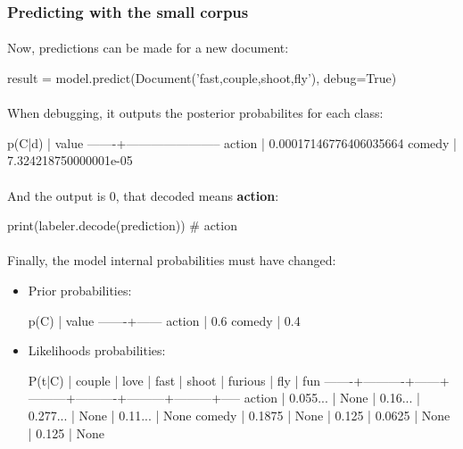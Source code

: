 \documentclass{article}
\begin{document}
\clearpage

\subsubsection*{Predicting with the small corpus}

\paragraph{} Now, predictions can be made for a new document:

\begin{python}
result = model.predict(Document('fast,couple,shoot,fly'), debug=True)
\end{python}

\paragraph{} When debugging, it outputs the posterior probabilites for each class:

\begin{python}
p(C|d) |                  value
-------+-----------------------
action | 0.00017146776406035664
comedy |  7.324218750000001e-05
\end{python}

\paragraph{} And the output is 0, that decoded means \textbf{action}:

\begin{python}
print(labeler.decode(prediction))
# action
\end{python}

\paragraph{} Finally, the model internal probabilities must have changed:

\begin{itemize}
\item Prior probabilities:
\begin{python}
p(C)   | value
-------+------
action |   0.6
comedy |   0.4
\end{python}
\item Likelihoods probabilities:
\begin{python}
P(t|C) |   couple | love |    fast |    shoot | furious |     fly |  fun
-------+----------+------+---------+----------+---------+---------+-----
action | 0.055... | None | 0.16... | 0.277... |    None | 0.11... | None
comedy |   0.1875 | None |   0.125 |   0.0625 |    None |   0.125 | None
\end{python}
\end{itemize}
\end{document}
